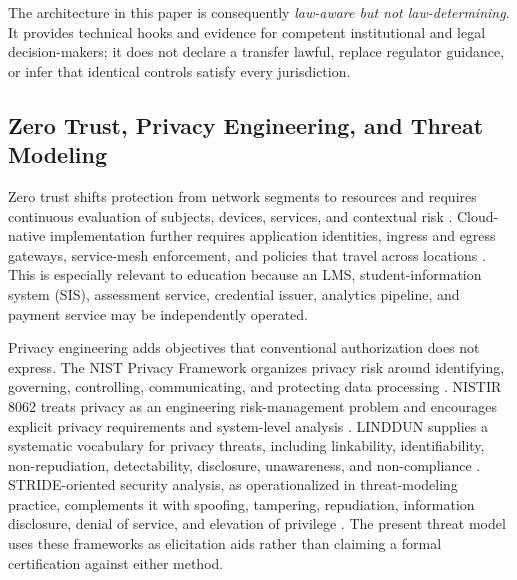 \documentclass[journal]{IEEEtran}
\begin{document}
The architecture in this paper is consequently \emph{law-aware but not law-determining}. It provides technical hooks and evidence for competent institutional and legal decision-makers; it does not declare a transfer lawful, replace regulator guidance, or infer that identical controls satisfy every jurisdiction.

\subsection{Zero Trust, Privacy Engineering, and Threat Modeling}
Zero trust shifts protection from network segments to resources and requires continuous evaluation of subjects, devices, services, and contextual risk \cite{nist800207}. Cloud-native implementation further requires application identities, ingress and egress gateways, service-mesh enforcement, and policies that travel across locations \cite{nist800207a}. This is especially relevant to education because an LMS, student-information system (SIS), assessment service, credential issuer, analytics pipeline, and payment service may be independently operated.

Privacy engineering adds objectives that conventional authorization does not express. The NIST Privacy Framework organizes privacy risk around identifying, governing, controlling, communicating, and protecting data processing \cite{nistprivacy}. NISTIR 8062 treats privacy as an engineering risk-management problem and encourages explicit privacy requirements and system-level analysis \cite{nist8062}. LINDDUN supplies a systematic vocabulary for privacy threats, including linkability, identifiability, non-repudiation, detectability, disclosure, unawareness, and non-compliance \cite{deng2011}. STRIDE-oriented security analysis, as operationalized in threat-modeling practice, complements it with spoofing, tampering, repudiation, information disclosure, denial of service, and elevation of privilege \cite{shostack2014}. The present threat model uses these frameworks as elicitation aids rather than claiming a formal certification against either method.
\end{document}
